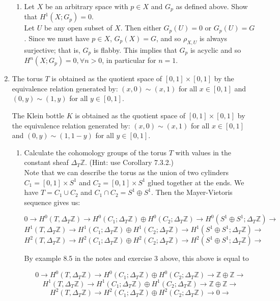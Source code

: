 \documentclass{article}
\newcommand{\zed}{\mathbb Z}
\begin{document}
\begin{enumerate}
\begin{enumerate}
\item Let $X$ be an arbitrary space with $p\in X$ and $G_p$ as defined above.
Show that $H^1(X;G_p)=0$.\\

Let $U$ be any open subset of $X$. Then either $G_p(U)=0$ or $G_p(U)=G$. Since we must have $p \in X$, $G_p(X)=G$, and so $\rho_{X,U}$ is always surjective; that is, $G_p$ is flabby.  This implies that $G_p$ is acyclic and so $H^n(X;G_p)=0, \forall n >0$, in particular for $n=1$.
\end{enumerate}
\newpage
\item
The torus $T$ is obtained as the quotient space of $[0,1]\times[0,1]$ by the equivalence relation generated by: 
$(x,0)\sim (x,1)$ for all $x\in [0,1]$ and $(0,y)\sim(1,y)$ for all $y\in [0,1]$.

The Klein bottle $K$ is obtained as the quotient space of $[0,1]\times[0,1]$ by the equivalence relation generated by: 
$(x,0)\sim (x,1)$ for all $x\in [0,1]$ and $(0,y)\sim(1,1-y)$ for all $y\in [0,1]$.
\begin{enumerate}
\item
Calculate the cohomology groups of the torus $T$ with values in the constant sheaf $\Delta_T\zed$. (Hint: use Corollary 7.3.2.)\\

Note that we can describe the torus as the union of two cylinders $C_1 = [0,1] \times S^1$ and $C_2 = [0,1] \times S^1$ glued together at the ends. We have $T=C_1 \cup C_2$ and $C_1 \cap C_2 = S^1 \oplus S^1$. Then the Mayer-Vietoris sequence gives us:

\[0 \rightarrow H^0(T, \Delta_T\mathbb{Z}) \rightarrow H^0(C_1;\Delta_T\mathbb{Z}) \oplus H^0(C_2;\Delta_T\mathbb{Z}) \rightarrow H^0( S^1 \oplus S^1; \Delta_T\mathbb{Z}) \rightarrow\]
\[ H^1(T, \Delta_T\mathbb{Z}) \rightarrow H^1(C_1;\Delta_T\mathbb{Z}) \oplus H^1(C_2;\Delta_T\mathbb{Z}) \rightarrow H^1( S^1 \oplus S^1; \Delta_T\mathbb{Z}) \rightarrow\]
\[ H^2(T, \Delta_T\mathbb{Z}) \rightarrow H^2(C_1;\Delta_T\mathbb{Z}) \oplus H^2(C_2;\Delta_T\mathbb{Z}) \rightarrow H^2( S^1 \oplus S^1; \Delta_T\mathbb{Z}) \rightarrow\]


By example 8.5 in the notes and exercise 3 above, this above is equal to 

\[0 \rightarrow H^0(T, \Delta_T\mathbb{Z}) \rightarrow H^0(C_1;\Delta_T\mathbb{Z}) \oplus H^0(C_2;\Delta_T\mathbb{Z}) \rightarrow  \mathbb{Z} \oplus \mathbb{Z} \rightarrow\]
\[ H^1(T, \Delta_T\mathbb{Z}) \rightarrow H^1(C_1;\Delta_T\mathbb{Z}) \oplus H^1(C_2;\Delta_T\mathbb{Z}) \rightarrow \mathbb{Z} \oplus \mathbb{Z} \rightarrow\]
\[ H^2(T, \Delta_T\mathbb{Z}) \rightarrow H^2(C_1;\Delta_T\mathbb{Z}) \oplus H^2(C_2;\Delta_T\mathbb{Z}) \rightarrow 0 \rightarrow\]


\end{enumerate}
\end{enumerate}
\end{document}
